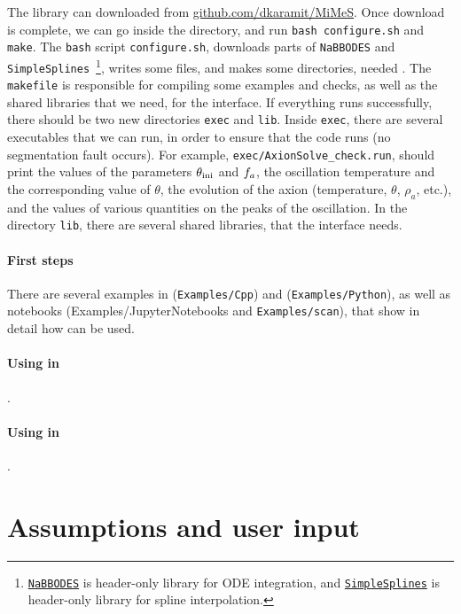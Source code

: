 \documentclass[11pt,a4paper]{article}
\begin{document}
The library can downloaded from \href{https://github.com/dkaramit/MiMeS}{github.com/dkaramit/MiMeS}. Once download is complete, we can go inside the \mimes directory, and run {\tt bash configure.sh} and  {\tt make}.  The {\tt bash} script {\tt configure.sh}, downloads parts of {\tt NaBBODES} and {\tt SimpleSplines}~\footnote{\href{https://github.com/dkaramit/NaBBODES}{\tt NaBBODES} is header-only library for ODE integration, and \href{https://github.com/dkaramit/SimpleSplines}{\tt SimpleSplines} is header-only library for spline interpolation.}, writes some files, and  makes some directories, needed \mimes. The {\tt makefile} is responsible for compiling some examples and checks, as well as the shared libraries that we need, for the \PY interface.  If everything runs successfully, there should be two new directories {\tt exec} and {\tt lib}. Inside {\tt exec}, there are several executables that we can run, in order to ensure that the code runs (\eg no segmentation fault occurs). For example, {\tt exec/AxionSolve\_check.run}, should print the values of the parameters $\theta_{\rm ini}{}$ and $f_{a}{}$, the oscillation temperature and the corresponding value of $\theta$, the evolution of the axion (\eg temperature, $\theta$, $\rho_{a}$, etc.), and the values of various quantities on the peaks of the oscillation.  In the directory {\tt lib}, there are several shared libraries, that the \PY interface needs.

\paragraph{First steps} There are several examples in \CPP ({\tt Examples/Cpp}) and \PY ({\tt Examples/Python}), as well as \JUPY  notebooks ({Examples/JupyterNotebooks} and {\tt Examples/scan}), that show in detail how \mimes can be used.

\paragraph{Using \mimes in \CPP} .

\paragraph{Using \mimes in \PY} .


\section{Assumptions and user input}\label{sec:assumptions}
\setcounter{equation}{0}
\end{document}

